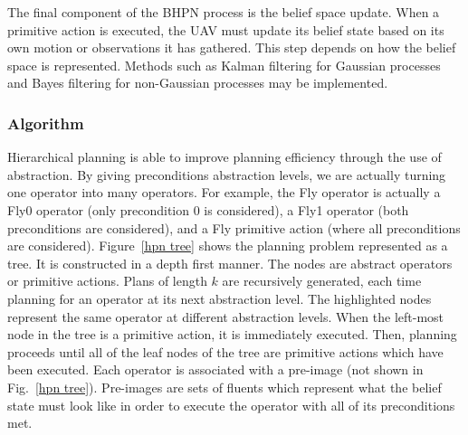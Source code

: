 \documentclass[12pt]{article}
\begin{document}
The final component of the BHPN process is the belief space update. When a primitive action is executed, the UAV must update its belief state based on its own motion or observations it has gathered. This step depends on how the belief space is represented. Methods such as Kalman filtering for Gaussian processes and Bayes filtering for non-Gaussian processes may be implemented.

\subsubsection{Algorithm} \label{bhpn algorithm}

Hierarchical planning is able to improve planning efficiency through the use of abstraction. By giving preconditions abstraction levels, we are actually turning one operator into many operators. For example, the Fly operator is actually a Fly0 operator (only precondition 0 is considered), a Fly1 operator (both preconditions are considered), and a Fly primitive action (where all preconditions are considered). Figure~\ref{hpn tree} shows the planning problem represented as a tree. It is constructed in a depth first manner. The nodes are abstract operators or primitive actions. Plans of  length $k$ are recursively generated, each time planning for an operator at its next abstraction level. The highlighted nodes represent the same operator at different abstraction levels. When the left-most node in the tree is a primitive action, it is immediately executed. Then, planning proceeds until all of the leaf nodes of the tree are primitive actions which have been executed. Each operator is associated with a pre-image (not shown in Fig.~\ref{hpn tree}). Pre-images are sets of fluents which represent what the belief state must look like in order to execute the operator with all of its preconditions met.
\end{document}
